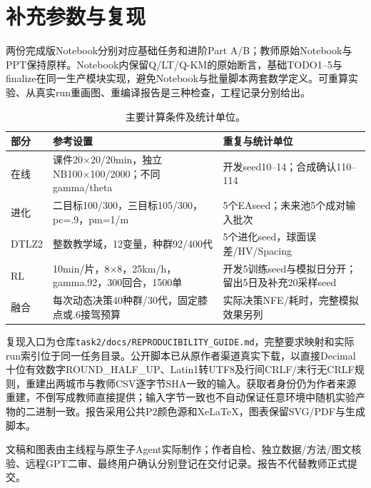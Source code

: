 \section{补充参数与复现}
两份完成版Notebook分别对应基础任务和进阶Part A/B；教师原始Notebook与PPT保持原样。Notebook内保留Q/LT/Q-KM的原始断言，基础TODO1--5与finalize在同一生产模块实现，避免Notebook与批量脚本两套数学定义。可重算实验、从真实run重画图、重编译报告是三种检查，工程记录分别给出。

\begin{table}[htbp]\centering\caption{主要计算条件及统计单位。}
\begin{tabularx}{\linewidth}{lYY}\toprule
部分&参考设置&重复与统计单位\\\midrule
在线&课件20×20/20min，独立NB100×100/2000；不同gamma/theta&开发seed10--14；合成确认110--114\\
进化&二目标100/300，三目标105/300，pc=.9，pm=1/m&5个EAseed；未来池5个成对输入批次\\
DTLZ2&整数教学域，12变量，种群92/400代&5个进化seed，球面误差/HV/Spacing\\
RL&10min/片，8×8，25km/h，gamma.92，300回合，1500单&开发5训练seed与模拟日分开；留出5日及补充20采样seed\\
融合&每次动态决策40种群/30代，固定膝点或.6接驾预算&实际决策NFE/耗时，完整模拟效果另列\\\bottomrule
\end{tabularx}\end{table}

复现入口为仓库\texttt{task2/docs/REPRODUCIBILITY\_GUIDE.md}，完整要求映射和实际run索引位于同一任务目录。公开脚本已从原作者渠道真实下载，以直接Decimal十位有效数字ROUND\_HALF\_UP、Latin1转UTF8及行间CRLF/末行无CRLF规则，重建出两城市与教师CSV逐字节SHA一致的输入。获取者身份仍为作者来源重建，不倒写成教师直接提供；输入字节一致也不自动保证任意环境中随机实验产物的二进制一致。报告采用公共P2颜色源和XeLaTeX，图表保留SVG/PDF与生成脚本。

文稿和图表由主线程与原生子Agent实际制作；作者自检、独立数据/方法/图文核验、远程GPT二审、最终用户确认分别登记在交付记录。报告不代替教师正式提交。
